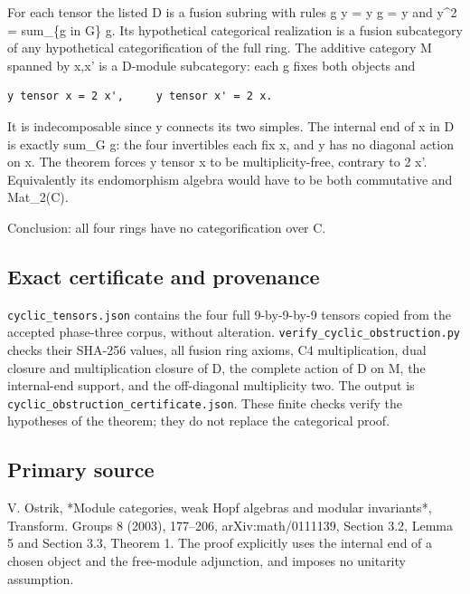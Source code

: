 For each tensor the listed D is a fusion subring with rules g y = y g =
y and y\^{}2 = sum\_\{g in G\} g. Its hypothetical categorical
realization is a fusion subcategory of any hypothetical categorification
of the full ring. The additive category M spanned by x,x' is a D-module
subcategory: each g fixes both objects and

\begin{verbatim}
y tensor x = 2 x',     y tensor x' = 2 x.
\end{verbatim}

It is indecomposable since y connects its two simples. The internal end
of x in D is exactly sum\_G g: the four invertibles each fix x, and y
has no diagonal action on x. The theorem forces y tensor x to be
multiplicity-free, contrary to 2 x'. Equivalently its endomorphism
algebra would have to be both commutative and Mat\_2(C).

Conclusion: all four rings have no categorification over C.

\hypertarget{exact-certificate-and-provenance}{%
\subsection{Exact certificate and
provenance}\label{exact-certificate-and-provenance}}

\texttt{cyclic\allowbreak{}\_\allowbreak{}tensor\allowbreak{}s.\allowbreak{}json}
contains the four full 9-by-9-by-9 tensors copied from the accepted
phase-three corpus, without alteration.
\texttt{verify\allowbreak{}\_\allowbreak{}cyclic\allowbreak{}\_\allowbreak{}obstru\allowbreak{}ction.\allowbreak{}py}
checks their SHA-256 values, all fusion ring axioms, C4 multiplication,
dual closure and multiplication closure of D, the complete action of D
on M, the internal-end support, and the off-diagonal multiplicity two.
The output is
\texttt{cyclic\allowbreak{}\_\allowbreak{}obstru\allowbreak{}ction\_\allowbreak{}certif\allowbreak{}icate.\allowbreak{}json}.
These finite checks verify the hypotheses of the theorem; they do not
replace the categorical proof.

\hypertarget{primary-source}{%
\subsection{Primary source}\label{primary-source}}

V. Ostrik, *Module categories, weak Hopf algebras and modular
invariants*, Transform. Groups 8 (2003), 177--206, arXiv:math/0111139,
Section 3.2, Lemma 5 and Section 3.3, Theorem 1. The proof explicitly
uses the internal end of a chosen object and the free-module adjunction,
and imposes no unitarity assumption.

